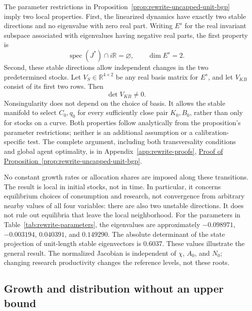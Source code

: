 The parameter restrictions in Proposition~\ref{prop:rewrite-uncapped-unit-bgp}
imply two local properties. First, the linearized dynamics have exactly two stable
directions and no eigenvalue with zero real part. Writing $E^s$ for the real
invariant subspace associated with eigenvalues having negative real parts,
the first property is
\begin{equation}
 \operatorname{spec}(J^*)\cap i\mathbb R=\varnothing,
 \qquad \dim E^s=2.
 \label{eq:rewrite-uncapped-unit-local-spectrum}
\end{equation}
Second, these stable directions allow independent changes in the two
predetermined stocks. Let $V_S\in\mathbb R^{4\times2}$ be any real basis
matrix for $E^s$, and let $V_{KB}$ consist of its first two rows. Then
\begin{equation}
 \det V_{KB}\ne0.
 \label{eq:rewrite-uncapped-unit-local-projection}
\end{equation}
Nonsingularity does not depend on the choice of basis. It allows the stable
manifold to select $C_0,q_0$ for every sufficiently close pair $K_0,B_0$,
rather than only for stocks on a curve. Both properties follow analytically
from the proposition's parameter restrictions; neither is an additional
assumption or a calibration-specific test. The complete argument, including both transversality
conditions and global agent optimality, is in Appendix~\ref{app:rewrite-proofs},
\hyperref[proof:rewrite-uncapped-unit-local]{Proof of
Proposition~\ref*{prop:rewrite-uncapped-unit-bgp}}.

No constant growth rates or allocation shares are imposed along these
transitions. The result is local in initial stocks, not in time. In particular,
it concerns equilibrium choices of consumption and research, not convergence
from arbitrary nearby values of all four variables: there are also two
unstable directions. It does not rule out equilibria that leave the local
neighborhood.
\ifshowlegacysimulations
For the parameters in Table~\ref{tab:rewrite-parameters}, the eigenvalues are
approximately $-0.098971$, $-0.003194$, $0.040391$, and $0.149290$.
The absolute determinant of the state projection of unit-length stable
eigenvectors is $0.6037$. These values illustrate the general result.
\fi
The normalized Jacobian is independent of $\chi$, $A_0$, and $N_0$;
changing research productivity changes the reference levels, not these roots.

\subsection{Growth and distribution without an upper bound}

